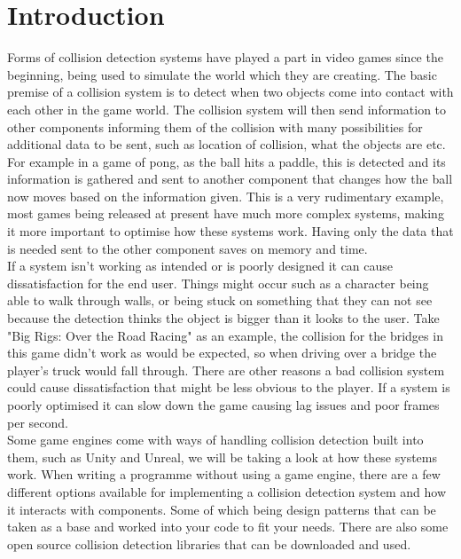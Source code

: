 \documentclass{scrartcl}
\begin{document}
	\section{Introduction}
	Forms of collision detection systems have played a part in video games since the beginning, being used to simulate the world which they are creating. The basic premise of a collision system is to detect when two objects come into contact with each other in the game world. The collision system will then send information to other components informing them of the collision with many possibilities for additional data to be sent, such as location of collision, what the objects are etc. For example in a game of pong, as the ball hits a paddle, this is detected and its information is gathered and sent to another component that changes how the ball now moves based on the information given. This is a very rudimentary example, most games being released at present have much more complex systems, making it more important to optimise how these systems work. Having only the data that is needed sent to the other component saves on memory and time.\\
	If a system isn't working as intended or is poorly designed it can cause dissatisfaction for the end user. Things might occur such as a character being able to walk through walls, or being stuck on something that they can not see because the detection thinks the object is bigger than it looks to the user. Take "Big Rigs: Over the Road Racing"\cite{bigrigs} as an example, the collision for the bridges in this game didn't work as would be expected, so when driving over a bridge the player's truck would fall through. There are other reasons a bad collision system could cause dissatisfaction that might be less obvious to the player. If a system is poorly optimised it can slow down the game causing lag issues and poor frames per second.\\
	Some game engines come with ways of handling collision detection built into them, such as Unity and Unreal\cite{dickson2017experience}, we will be taking a look at how these systems work. When writing a programme without using a game engine, there are a few different options available for implementing a collision detection system and how it interacts with components. Some of which being design patterns that can be taken as a base and worked into your code to fit your needs\cite{designpatternsandrefactoring_2018}. There are also some open source collision detection libraries that can be downloaded and used\cite{jslee02/awesome-collision-detection_2018}. 
	
\end{document}
